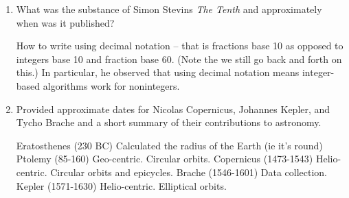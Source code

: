 \documentclass[12pt]{article}
\begin{document}
\begin{enumerate}
\vfill
\item What was the substance of Simon Stevins \textit{The Tenth} and approximately when was it published?

How to write using decimal notation -- that is fractions base 10 as opposed to integers base 10 and fraction base 60. (Note the we still go back and forth on this.) In particular, he observed that using decimal notation means integer-based algorithms work for nonintegers.
\vfill
\item Provided approximate dates for Nicolas Copernicus, Johannes Kepler, and Tycho Brache and a short summary of their contributions to astronomy.

Eratosthenes (230 BC) Calculated the radius of the Earth (ie it's round)
Ptolemy (85-160) Geo-centric. Circular orbits.
Copernicus (1473-1543) Helio-centric. Circular orbits and epicycles.
Brache (1546-1601) Data collection.
Kepler (1571-1630) Helio-centric. Elliptical orbits.
\vfill
\end{enumerate}
\end{document}
